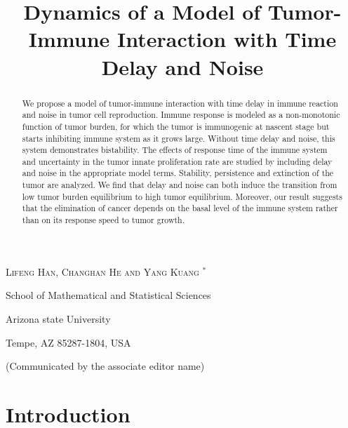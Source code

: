 \documentclass{aims}
\title[a model of tumor-immune system interaction] %
      {Dynamics of a Model of Tumor-Immune Interaction with Time Delay and Noise}
\author[Lifeng Han, Changhan He and Yang Kuang]{}
\theoremstyle{definition}
\begin{document}
\maketitle

\centerline{\scshape Lifeng Han, Changhan He and Yang Kuang $^*$}
\medskip
{\footnotesize
 \centerline{School of Mathematical and Statistical Sciences}
   \centerline{Arizona state University}
   \centerline{Tempe, AZ 85287-1804, USA}
} %

%

\bigskip

 \centerline{(Communicated by the associate editor name)}



\begin{abstract}
We propose a model of tumor-immune interaction with time delay in immune reaction and noise in tumor cell reproduction. Immune
response is modeled as a non-monotonic function of tumor burden, for
which the tumor is immunogenic at nascent stage but starts inhibiting
immune system as it grows large. Without time delay and noise, this system demonstrates bistability.
The effects of response time of the immune system and uncertainty
in the tumor innate proliferation rate are studied by including delay
and noise in the appropriate model terms. Stability, persistence
and extinction of the tumor are analyzed. We find that delay
and noise can both induce the transition from low tumor burden equilibrium
to high tumor equilibrium. Moreover, our result suggests that the elimination of cancer depends on the basal level of the immune system rather than on its response speed to tumor growth.
\end{abstract}


\section{Introduction}
\end{document}
